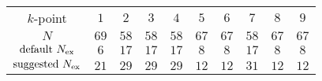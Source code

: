 \begin{tabular}{cccccccccc}
$k$-point & $1$ & $2$ & $3$ & $4$ & $5$ & $6$ & $7$ & $8$ & $9$\\
$N$ & $69$ & $58$ & $58$ & $58$ & $67$ & $67$ & $58$ & $67$ & $67$\\
$\text{default } N_{\rm ex}$ & $6$ & $17$ & $17$ & $17$ & $8$ & $8$ & $17$ & $8$ & $8$\\
$\text{suggested } N_{\rm ex}$ & $21$ & $29$ & $29$ & $29$ & $12$ & $12$ & $31$ & $12$ & $12$\\
\end{tabular}
